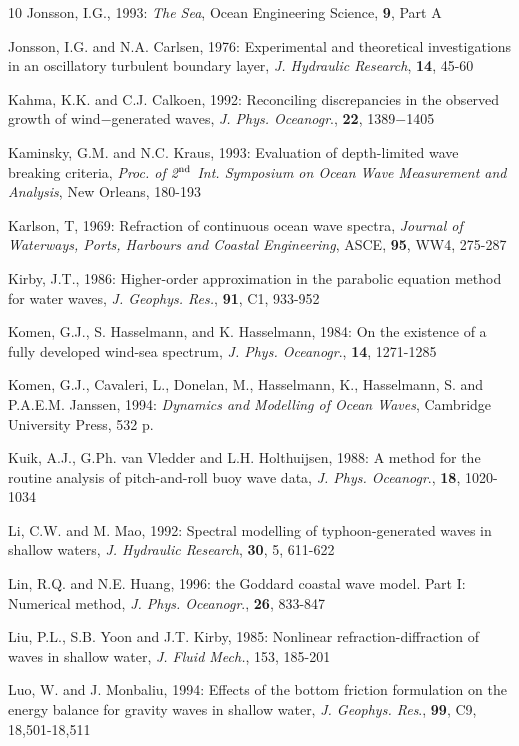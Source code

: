 \documentclass[12pt]{book}
\begin{document}
\begin{thebibliography}{10}
Jonsson, I.G., 1993: {\it The Sea}, Ocean Engineering Science, {\bf 9}, Part A

Jonsson, I.G. and N.A. Carlsen, 1976: Experimental and theoretical investigations in an oscillatory
turbulent boundary layer, {\it J. Hydraulic Research}, {\bf 14}, 45-60

Kahma, K.K. and C.J. Calkoen, 1992: Reconciling discrepancies in the observed growth of
wind$-$generated waves, {\it J. Phys. Oceanogr}., {\bf 22}, 1389$-$1405

Kaminsky, G.M. and N.C. Kraus, 1993: Evaluation of depth-limited wave breaking criteria, {\it Proc.
of 2$^{{\rm nd}}$ Int. Symposium on Ocean Wave Measurement and Analysis}, New Orleans, 180-193

Karlson, T, 1969: Refraction of continuous ocean wave spectra, {\it Journal of Waterways, Ports, Harbours
and Coastal Engineering}, ASCE, {\bf 95}, WW4, 275-287

Kirby, J.T., 1986: Higher-order approximation in the parabolic equation method for water waves, {\it J.
Geophys. Res.}, {\bf 91}, C1, 933-952

Komen, G.J., S. Hasselmann, and K. Hasselmann, 1984: On the existence of a fully developed wind-sea
spectrum, {\it J. Phys. Oceanogr}., {\bf 14}, 1271-1285

Komen, G.J., Cavaleri, L., Donelan, M., Hasselmann, K., Hasselmann, S. and P.A.E.M. Janssen, 1994:
{\it Dynamics and Modelling of Ocean Waves}, Cambridge University Press, 532 p.

Kuik, A.J., G.Ph. van Vledder and L.H. Holthuijsen, 1988: A method for the routine  analysis of
pitch-and-roll buoy wave data, {\it J. Phys. Oceanogr}., {\bf 18}, 1020-1034

Li, C.W. and M. Mao, 1992: Spectral modelling of typhoon-generated waves in shallow waters, {\it J.
Hydraulic Research}, {\bf 30}, 5, 611-622

Lin, R.Q. and N.E. Huang, 1996: the Goddard coastal wave model. Part I: Numerical method, {\it J. Phys.
Oceanogr}., {\bf 26}, 833-847

Liu, P.L., S.B. Yoon and J.T. Kirby, 1985: Nonlinear refraction-diffraction of waves in shallow water, {\it J. Fluid
Mech.}, 153, 185-201

Luo, W. and J. Monbaliu, 1994: Effects of the bottom friction formulation on the energy balance for gravity
waves in shallow water, {\it J. Geophys. Res}., {\bf 99}, C9, 18,501-18,511


\end{thebibliography}
\end{document}
